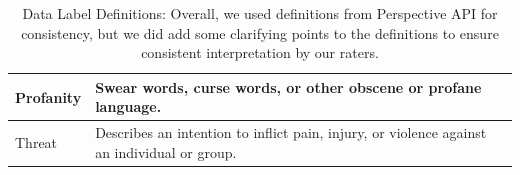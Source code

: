 \documentclass[11pt]{article}
\begin{document}
\begin{table}[h]
\begin{tabular}{ll}
Profanity               & Swear words, curse words, or other obscene or profane language.                                                                                                                                                                                                                                                                    \\ \hline
Threat                  & Describes an intention to inflict pain, injury, or violence against an individual or group.                                                                                                                                                                                                                                        \\ \hline
\end{tabular}
\caption{\label{label-definitions}
Data Label Definitions: Overall, we used definitions from Perspective API for consistency, but we did add some clarifying points to the definitions to ensure consistent interpretation by our raters.  }
\end{table}
\end{document}
